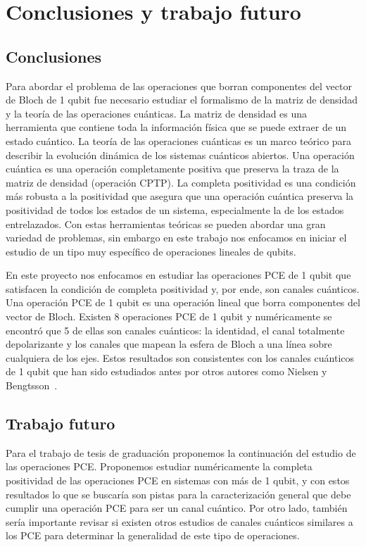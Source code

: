 \chapter{Conclusiones y trabajo futuro}
\section{Conclusiones}

Para abordar el problema de las operaciones que borran componentes 
del vector de Bloch de 1 qubit fue necesario estudiar el formalismo de 
la matriz de densidad y la teoría de las operaciones cuánticas. 
La matriz de densidad es una herramienta que contiene toda la información 
física que se puede extraer de un estado cuántico. La teoría de las 
operaciones cuánticas es un marco teórico para describir 
la evolución dinámica de los sistemas cuánticos abiertos. 
Una operación cuántica es una operación completamente positiva 
que preserva la traza de la matriz de densidad (operación CPTP).
La completa positividad es una condición más robusta a la positividad 
que asegura que una operación cuántica preserva la positividad de todos 
los estados de un sistema, especialmente la de los estados entrelazados.
Con estas herramientas teóricas se pueden abordar una gran variedad
de problemas, sin embargo en este trabajo nos enfocamos en iniciar el 
estudio de un tipo muy específico de operaciones lineales de qubits.

En este proyecto nos enfocamos en estudiar las operaciones PCE 
de 1 qubit que satisfacen la condición de completa positividad
y, por ende, son canales cuánticos. Una operación PCE 
de 1 qubit es una operación lineal que borra componentes del 
vector de Bloch. Existen 8 operaciones PCE de 1 qubit y 
numéricamente se encontró que 5 de ellas son 
canales cuánticos: la identidad, el canal totalmente depolarizante 
y los canales que mapean la esfera de Bloch a una línea sobre 
cualquiera de los ejes. Estos resultados son consistentes 
con los canales cuánticos de 1 qubit que han sido estudiados antes 
por otros autores como Nielsen y
Bengtsson~\cite{bengtsson_zyczkowski_2017,nielsen_chuang_2011}.

\section{Trabajo futuro}
Para el trabajo de tesis de graduación proponemos la continuación del
estudio de las operaciones PCE. Proponemos estudiar numéricamente 
la completa positividad de las operaciones PCE en sistemas con 
más de 1 qubit, y con estos resultados lo que se buscaría son pistas 
para la caracterización general que debe cumplir una operación 
PCE para ser un canal cuántico. Por otro lado, también sería importante
revisar si existen otros estudios de canales cuánticos similares a los 
PCE para determinar la generalidad de este tipo de operaciones.

